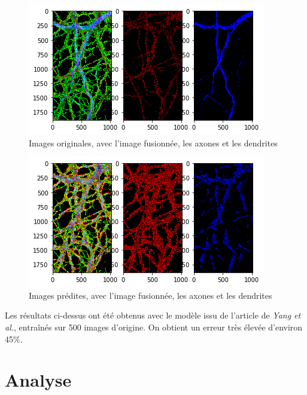 \documentclass{report}
\begin{document}
\begin{figure}[H]
\centering
\includegraphics[scale=0.5]{"truth"}
\caption{Images originales, avec l'image fusionnée, les axones et les dendrites}
\end{figure}

\begin{figure}[H]
\centering
\includegraphics[scale=0.5]{"result"}
\caption{Images prédites, avec l'image fusionnée, les axones et les dendrites}
\end{figure}

Les résultats ci-dessus ont été obtenus avec le modèle issu de l'article de
\textit{Yang et al.}, entraînés sur 500 images d'origine. On obtient un erreur
très élevée d'environ 45\%.

\chapter{Analyse}
\end{document}

